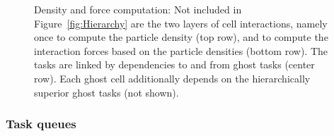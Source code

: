 \documentclass[final]{siamltex}
\newcommand{\fig}[1]
    {Figure~\ref{fig:#1}}
\begin{document}
\begin{figure}[ht]
    \centerline{}
    
    \caption{Density and force computation: Not included in \fig{Hierarchy}
        are the two layers of cell interactions, namely once to compute
        the particle density (top row), and to compute the interaction
        forces based on the particle densities (bottom row).
        The tasks are linked by dependencies to and from ghost tasks
        (center row).
        Each ghost cell additionally depends on the hierarchically superior
        ghost tasks (not shown).
        }
    \label{fig:DensityForce}
\end{figure}


\subsubsection{Task queues}
\end{document}
